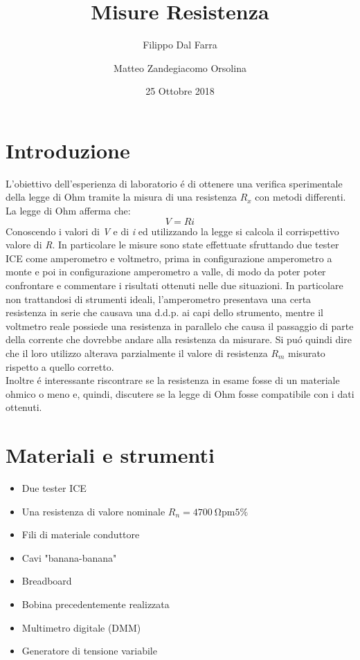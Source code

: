 \documentclass{article}
\title{Misure Resistenza}
\author{Filippo Dal Farra \and Matteo Zandegiacomo Orsolina}
\date{25 Ottobre 2018}
\begin{document}
\maketitle

\newpage

\section{Introduzione}
L'obiettivo dell'esperienza di laboratorio \'e di ottenere una verifica sperimentale della legge di Ohm tramite la misura di una resistenza $R_x$ con metodi differenti.\\
La legge di Ohm afferma che: \\
\begin{equation}
    V = R i
    \label{eq:Ohm}
\end{equation}
Conoscendo i valori di \textit{V} e di \textit{i} ed utilizzando la legge si calcola il corrispettivo valore di \textit{R}. In particolare le misure sono state effettuate sfruttando due tester ICE come amperometro e voltmetro, prima in configurazione amperometro a monte e poi in configurazione amperometro a valle, di modo da poter poter confrontare e commentare i risultati ottenuti nelle due situazioni. In particolare non trattandosi di strumenti ideali, l'amperometro presentava una certa resistenza in serie che causava una d.d.p. ai capi dello strumento, mentre il voltmetro reale possiede una resistenza in parallelo che causa il passaggio di parte della corrente che dovrebbe andare alla resistenza da misurare. Si pu\'o quindi dire che il loro utilizzo alterava parzialmente il valore di resistenza $R_m$ misurato rispetto a quello corretto.\\
Inoltre \'e interessante riscontrare se la resistenza in esame fosse di un materiale ohmico o meno e, quindi, discutere se la legge di Ohm fosse compatibile con i dati ottenuti.\\

\newpage

\section{Materiali e strumenti}

\begin{itemize}
  \item Due tester ICE
  \item Una resistenza di valore nominale $R_{n}= \SI{4700}{\ohm \pm 5\percent}$
  \item Fili di materiale conduttore
  \item Cavi "banana-banana"
  \item Breadboard
  \item Bobina precedentemente realizzata
  \item Multimetro digitale (DMM)
  \item Generatore di tensione variabile
\end{itemize}
\end{document}
